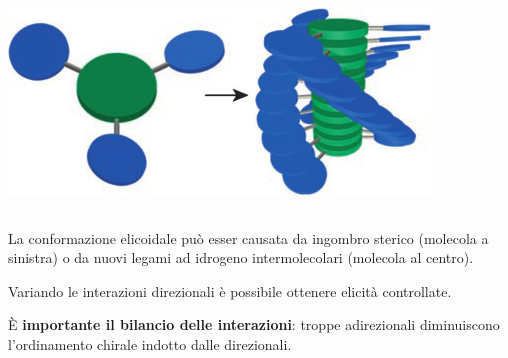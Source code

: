 \begin{frame}
\begin{columns}
  \includegraphics[width=1\textwidth]{sec2/C3.png}\end{columns}\vspace{15pt}
 
La conformazione elicoidale può esser causata da ingombro sterico (molecola a sinistra) o da nuovi legami ad idrogeno intermolecolari (molecola al centro). 


Variando le interazioni direzionali è possibile ottenere elicità controllate.

È \textbf{importante il bilancio delle interazioni}: 
troppe adirezionali diminuiscono l'ordinamento chirale indotto dalle direzionali.
             \end{frame}\logo{}
